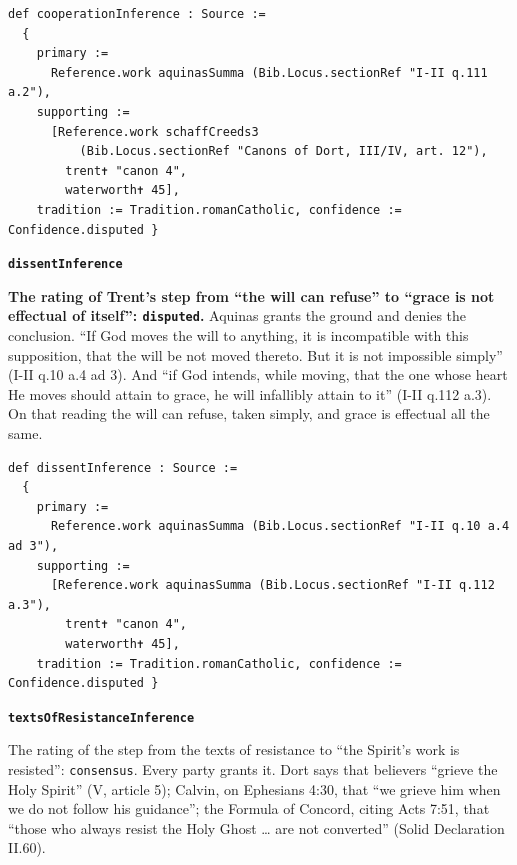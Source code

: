 \documentclass[11pt]{article}
\begin{document}
{\small\begin{verbatim}
def cooperationInference : Source :=
  {
    primary :=
      Reference.work aquinasSumma (Bib.Locus.sectionRef "I-II q.111 a.2"),
    supporting :=
      [Reference.work schaffCreeds3
          (Bib.Locus.sectionRef "Canons of Dort, III/IV, art. 12"),
        trent✝ "canon 4",
        waterworth✝ 45],
    tradition := Tradition.romanCatholic, confidence := Confidence.disputed }
\end{verbatim}}
\par\medskip\noindent\textbf{\texttt{dissent\allowbreak{}Inference}}\par\nobreak\noindent
\textbf{The rating of Trent’s step from “the will can refuse” to “grace is not effectual of itself”: \texttt{disputed}.} Aquinas grants the ground and denies the conclusion. “If God moves the will to anything, it is incompatible with this supposition, that the will be not moved thereto. But it is not impossible simply” (I-II q.10 a.4 ad 3). And “if God intends, while moving, that the one whose heart He moves should attain to grace, he will infallibly attain to it” (I-II q.112 a.3). On that reading the will can refuse, taken simply, and grace is effectual all the same.

{\small\begin{verbatim}
def dissentInference : Source :=
  {
    primary :=
      Reference.work aquinasSumma (Bib.Locus.sectionRef "I-II q.10 a.4 ad 3"),
    supporting :=
      [Reference.work aquinasSumma (Bib.Locus.sectionRef "I-II q.112 a.3"),
        trent✝ "canon 4",
        waterworth✝ 45],
    tradition := Tradition.romanCatholic, confidence := Confidence.disputed }
\end{verbatim}}
\par\medskip\noindent\textbf{\texttt{texts\allowbreak{}Of\allowbreak{}Resistance\allowbreak{}Inference}}\par\nobreak\noindent
The rating of the step from the texts of resistance to “the Spirit’s work is resisted”: \texttt{consensus}. Every party grants it. Dort says that believers “grieve the Holy Spirit” (V, article 5); Calvin, on Ephesians 4:30, that “we grieve him when we do not follow his guidance”; the Formula of Concord, citing Acts 7:51, that “those who always resist the Holy Ghost … are not converted” (Solid Declaration II.60).
\end{document}
